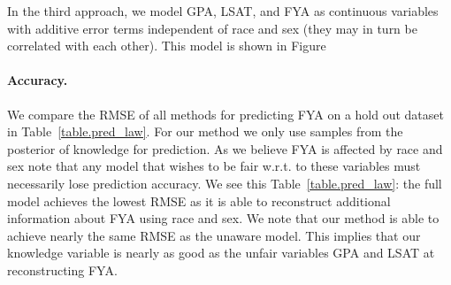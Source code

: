 In the third approach, we model GPA, LSAT, and FYA as continuous variables with additive error terms independent of race and sex (they may in turn be correlated with each other). This model is shown in Figure





\paragraph{Accuracy.}
We compare the RMSE of all methods for predicting FYA on a hold out dataset in Table~\ref{table.pred_law}. For our method we only use samples from the posterior of knowledge for prediction. As we believe FYA is affected by race and sex note that any model that wishes to be fair w.r.t. to these variables must necessarily lose prediction accuracy. We see this Table~\ref{table.pred_law}: the full model achieves the lowest RMSE as it is able to reconstruct additional information about FYA using race and sex. We note that our method is able to achieve nearly the same RMSE as the unaware model. This implies that our knowledge variable is nearly as good as the unfair variables GPA and LSAT at reconstructing FYA.


